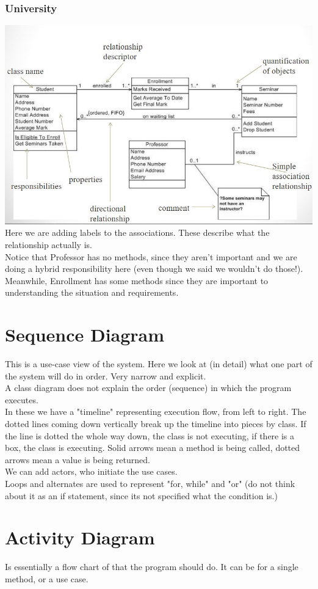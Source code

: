 \documentclass[12pt]{article}
\theoremstyle{definition}
\begin{document}
\subsubsection{University}
\includegraphics[]{university}
\\
Here we are adding labels to the associations. These describe what the relationship actually is. 
\\ \linebreak
Notice that Professor has no methods, since they aren't important and we are doing a hybrid responsibility here (even though we said we wouldn't do those!). Meanwhile, Enrollment has some methods since they are important to understanding the situation and requirements.
\\ \linebreak

\section{Sequence Diagram}
This is a use-case view of the system. Here we look at (in detail) what one part of the system will do in order. Very narrow and explicit.
\\ \linebreak
A class diagram does not explain the order (sequence) in which the program executes.
\\ \linebreak
In these we have a "timeline" representing execution flow, from left to right. The dotted lines coming down vertically break up the timeline into pieces by class. If the line is dotted the whole way down, the class is not executing, if there is a box, the class is executing. Solid arrows mean a method is being called, dotted arrows mean a value is being returned.
\\ \linebreak
We can add actors, who initiate the use cases.
\\ \linebreak
Loops and alternates are used to represent "for, while" and "or" (do not think about it as an if statement, since its not specified what the condition is.)
\\ \linebreak

\section{Activity Diagram}
Is essentially a flow chart of that the program should do. It can be for a single method, or a use case.
\\ \linebreak
\end{document}
